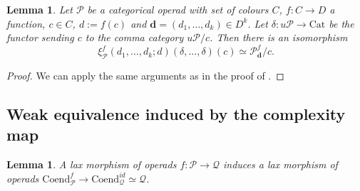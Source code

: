 \documentclass[]{amsart}
\newtheorem{lemma}[theorem]{Lemma}
\theoremstyle{definition}
\begin{document}
\begin{lemma}\label{lemmaformulacoend}
	Let $\mathcal{P}$ be a categorical operad with set of colours $C$, $f: C \to D$ a function, $c \in C$, $d:=f(c)$ and $\mathbf{d} = (d_1,\ldots,d_k) \in D^k$. Let $\delta: u\mathcal{P} \to \mathrm{Cat}$ be the functor sending $c$ to the comma category $u\mathcal{P}/c$. Then there is an isomorphism
	\[
		\xi_{\mathcal{P}}^f(d_1,\ldots,d_k;d)(\delta,\ldots,\delta)(c) \simeq \mathcal{P}_{\mathbf{d}}^f/c.
	\]
\end{lemma}

\begin{proof}
	We can apply the same arguments as in the proof of \cite[Lemma 3.3]{delegergregocondensation}.
\end{proof}



\subsection{Weak equivalence induced by the complexity map}

\begin{lemma}\label{lemmainducedlaxmorphism}
	A lax morphism of operads $f: \mathcal{P} \to \mathcal{Q}$ induces a lax morphism of operads $\mathrm{Coend}_\mathcal{P}^f \to \mathrm{Coend}_\mathcal{Q}^{id} \simeq \mathcal{Q}$.
\end{lemma}
\end{document}
